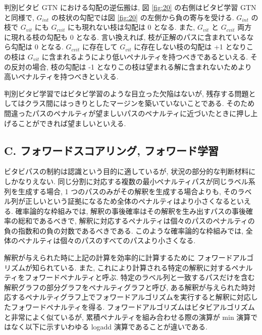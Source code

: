 \documentclass[twocolumn]{jarticle}     %
\begin{document}
判別ビタビ GTN における勾配の逆伝搬は, 図 \ref{fig:20} の右側はビタビ学習 GTN と同様で, $G_{int}$ の枝状の勾配では図 \ref{fig:20} の左側から負の寄与を受ける. $G_{int}$ の枝で $G_{vit}$ にも $G_{cvit}$ にも現れない枝は勾配は 0 となる. また, $G_{vit}$ と $G_{cvit}$ 両方に現れる枝の勾配も 0 となる. 言い換えれば, 枝が正解のパスに含まれているなら勾配は 0 となる. $G_{cvit}$ に存在して $G_{vit}$ に存在しない枝の勾配は +1 となりこの枝は $G_{vit}$ に含まれるようにより低いペナルティを持つべきであるといえる.
その反対の場合, 枝の勾配は -1 となりこの枝は望まれる解に含まれないためより高いペナルティを持つべきといえる. 
\par
判別ビタビ学習ではビタビ学習のような目立った欠陥はないが, 残存する問題としてはクラス間にはっきりとしたマージンを築いていないことである. そのため間違ったパスのペナルティが望ましいパスのペナルティに近づいたときに押し上げることができれば望ましいといえる.
\subsection*{C. フォワードスコアリング, フォワード学習}
ビタビパスの制約は認識という目的に適しているが, 状況の部分的な判断材料にしかなりえない. 同じ分割に対応する複数の最小ペナルティパスが同じラベル系列を生成する場合, 1 つのパスのみがその解釈を生成する場合よりも, そのラベル列が正しいという証拠になるため全体のペナルティはより小さくなるといえる.
確率論的な枠組みでは, 解釈の事後確率はその解釈を生み出すパスの事後確率の総和であるべきで, 解釈に対応するペナルティは個々のパスのペナルティの負の指数和の負の対数であるべきである. このような確率論的な枠組みでは, 全体のペナルティは個々のパスのすべてのパスより小さくなる. 
\par
解釈が与えられた時に上記の計算を効率的に計算するために フォワードアルゴリズムが知られている. また, これにより計算される特定の解釈に対するペナルティをフォワードペナルティと呼ぶ.
特定のラベル列と一致するパスだけを含む解釈グラフの部分グラフをペナルティグラフと呼び, ある解釈が与えられた時対応するペナルティグラフ上でフォワードアルゴリズムを実行すると解釈に対応したフォワードペナルティを得る. フォワードアルゴリズムはビタビアルゴリズムと非常によく似ているが, 累積ペナルティを組み合わせる際の演算が min 演算ではなく以下に示すいわゆる logadd 演算であることが違いである. 
\end{document}
